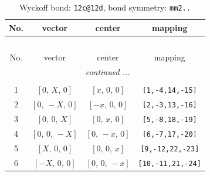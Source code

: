 \documentclass[fleqn,8pt]{jsarticle}
\begin{document}
\begin{longtable}{cccc}
\caption{Wyckoff bond: {\tt 12c@12d}, bond symmetry: {\tt mm2..}}
 \\
 \hline \hline
No. & vector & center & mapping \\ \hline \endfirsthead

\multicolumn{3}{l}{\tablename\ \thetable{}} \\
 \hline \hline
No. & vector & center & mapping \\ \hline \endhead

 \hline \hline
\multicolumn{3}{r}{\footnotesize\it continued ...} \\ \endfoot

 \hline \hline
\multicolumn{3}{r}{} \\ \endlastfoot

1 & $\left[ 0,\, X,\, 0 \right]$ & $\left[ x,\, 0,\, 0 \right]$ & {\tt [1,-4,14,-15]} \\ \hline
2 & $\left[ 0,\, - X,\, 0 \right]$ & $\left[ - x,\, 0,\, 0 \right]$ & {\tt [2,-3,13,-16]} \\ \hline
3 & $\left[ 0,\, 0,\, X \right]$ & $\left[ 0,\, x,\, 0 \right]$ & {\tt [5,-8,18,-19]} \\ \hline
4 & $\left[ 0,\, 0,\, - X \right]$ & $\left[ 0,\, - x,\, 0 \right]$ & {\tt [6,-7,17,-20]} \\ \hline
5 & $\left[ X,\, 0,\, 0 \right]$ & $\left[ 0,\, 0,\, x \right]$ & {\tt [9,-12,22,-23]} \\ \hline
6 & $\left[ - X,\, 0,\, 0 \right]$ & $\left[ 0,\, 0,\, - x \right]$ & {\tt [10,-11,21,-24]} \\
\end{longtable}
\renewcommand{\arraystretch}{1.2}
\end{document}
